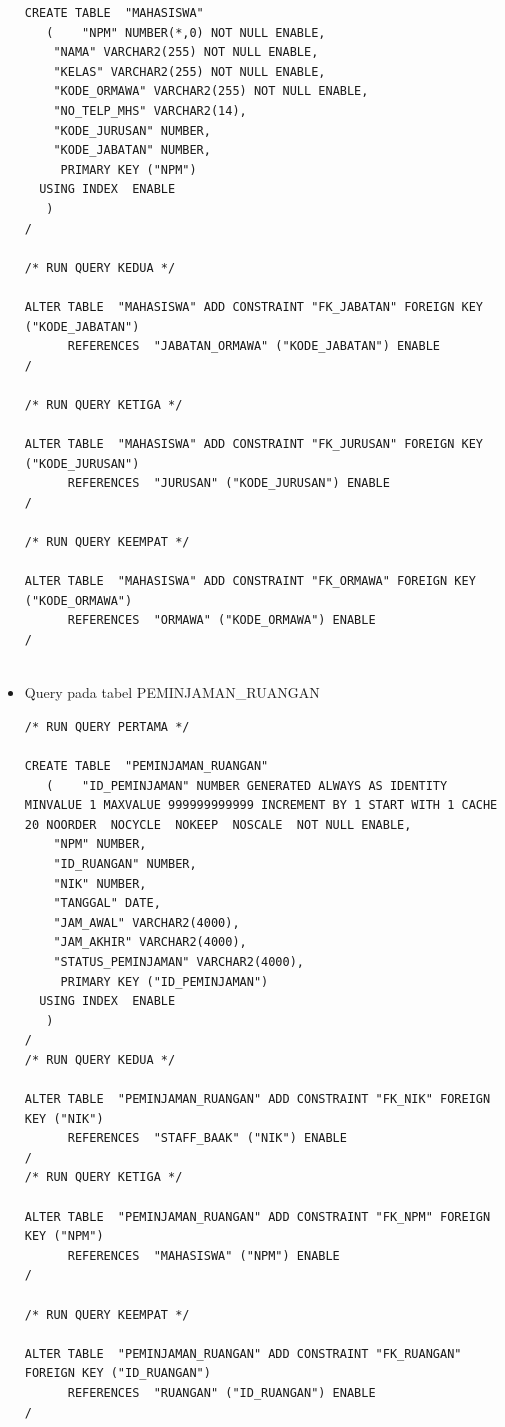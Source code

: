\begin{itemize}
\begin{lstlisting}
CREATE TABLE  "MAHASISWA" 
   (	"NPM" NUMBER(*,0) NOT NULL ENABLE, 
	"NAMA" VARCHAR2(255) NOT NULL ENABLE, 
	"KELAS" VARCHAR2(255) NOT NULL ENABLE, 
	"KODE_ORMAWA" VARCHAR2(255) NOT NULL ENABLE, 
	"NO_TELP_MHS" VARCHAR2(14), 
	"KODE_JURUSAN" NUMBER, 
	"KODE_JABATAN" NUMBER, 
	 PRIMARY KEY ("NPM")
  USING INDEX  ENABLE
   )
/

/* RUN QUERY KEDUA */

ALTER TABLE  "MAHASISWA" ADD CONSTRAINT "FK_JABATAN" FOREIGN KEY ("KODE_JABATAN")
	  REFERENCES  "JABATAN_ORMAWA" ("KODE_JABATAN") ENABLE
/

/* RUN QUERY KETIGA */

ALTER TABLE  "MAHASISWA" ADD CONSTRAINT "FK_JURUSAN" FOREIGN KEY ("KODE_JURUSAN")
	  REFERENCES  "JURUSAN" ("KODE_JURUSAN") ENABLE
/

/* RUN QUERY KEEMPAT */

ALTER TABLE  "MAHASISWA" ADD CONSTRAINT "FK_ORMAWA" FOREIGN KEY ("KODE_ORMAWA")
	  REFERENCES  "ORMAWA" ("KODE_ORMAWA") ENABLE
/
            
            \end{lstlisting}
\item Query pada tabel PEMINJAMAN\_RUANGAN
            \begin{lstlisting}
/* RUN QUERY PERTAMA */

CREATE TABLE  "PEMINJAMAN_RUANGAN" 
   (	"ID_PEMINJAMAN" NUMBER GENERATED ALWAYS AS IDENTITY MINVALUE 1 MAXVALUE 999999999999 INCREMENT BY 1 START WITH 1 CACHE 20 NOORDER  NOCYCLE  NOKEEP  NOSCALE  NOT NULL ENABLE, 
	"NPM" NUMBER, 
	"ID_RUANGAN" NUMBER, 
	"NIK" NUMBER, 
	"TANGGAL" DATE, 
	"JAM_AWAL" VARCHAR2(4000), 
	"JAM_AKHIR" VARCHAR2(4000), 
	"STATUS_PEMINJAMAN" VARCHAR2(4000), 
	 PRIMARY KEY ("ID_PEMINJAMAN")
  USING INDEX  ENABLE
   )
/
/* RUN QUERY KEDUA */

ALTER TABLE  "PEMINJAMAN_RUANGAN" ADD CONSTRAINT "FK_NIK" FOREIGN KEY ("NIK")
	  REFERENCES  "STAFF_BAAK" ("NIK") ENABLE
/
/* RUN QUERY KETIGA */

ALTER TABLE  "PEMINJAMAN_RUANGAN" ADD CONSTRAINT "FK_NPM" FOREIGN KEY ("NPM")
	  REFERENCES  "MAHASISWA" ("NPM") ENABLE
/

/* RUN QUERY KEEMPAT */

ALTER TABLE  "PEMINJAMAN_RUANGAN" ADD CONSTRAINT "FK_RUANGAN" FOREIGN KEY ("ID_RUANGAN")
	  REFERENCES  "RUANGAN" ("ID_RUANGAN") ENABLE
/
            
            \end{lstlisting}

\end{itemize}
